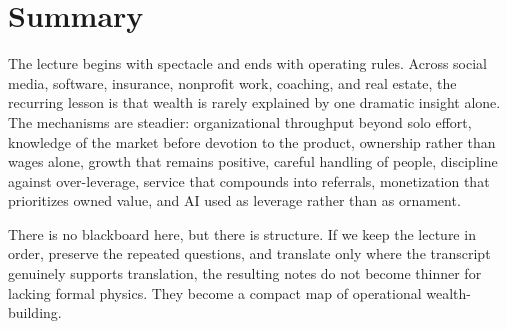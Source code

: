 \section{Summary}

The lecture begins with spectacle and ends with operating rules. Across social media, software, insurance, nonprofit work, coaching, and real estate, the recurring lesson is that wealth is rarely explained by one dramatic insight alone. The mechanisms are steadier: organizational throughput beyond solo effort, knowledge of the market before devotion to the product, ownership rather than wages alone, growth that remains positive, careful handling of people, discipline against over-leverage, service that compounds into referrals, monetization that prioritizes owned value, and AI used as leverage rather than as ornament.

There is no blackboard here, but there is structure. If we keep the lecture in order, preserve the repeated questions, and translate only where the transcript genuinely supports translation, the resulting notes do not become thinner for lacking formal physics. They become a compact map of operational wealth-building.